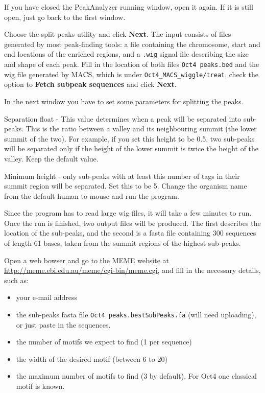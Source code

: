 \begin{steps}
If you have closed the PeakAnalyzer running window, open it again. If it is
still open, just go back to the first window.

Choose the split peaks utility and click \textbf{Next}. The input consists of
files generated by most peak-finding tools: a file containing the chromosome,
start and end locations of the enriched regions, and a \texttt{.wig} signal file
describing the size and shape of each peak. Fill in the location of both files
\texttt{Oct4 peaks.bed} and the wig file generated by MACS, which is under
\texttt{Oct4\_MACS\_wiggle/treat}, check the option to \textbf{Fetch subpeak
sequences} and click \textbf{Next}.

In the next window you have to set some parameters for splitting the peaks.

Separation float - This value determines when a peak will be separated into
sub-peaks. This is the ratio between a valley and its neighbouring summit (the
lower summit of the two). For example, if you set this height to be 0.5, two
sub-peaks will be separated only if the height of the lower summit is twice the
height of the valley. Keep the default value.

Minimum height - only sub-peaks with at least this number of tags in their
summit region will be separated. Set this to be 5. Change the organism name from
the default human to mouse and run the program.
\end{steps}

\begin{information}
Since the program has to read large wig files, it will take a few minutes to
run. Once the run is finished, two output files will be produced. The first
describes the location of the sub-peaks, and the second is a fasta file
containing 300 sequences of length 61 bases, taken from the summit regions of
the highest sub-peaks.
\end{information}

\begin{steps}
Open a web bowser and go to the MEME website at
\url{http://meme.ebi.edu.au/meme/cgi-bin/meme.cgi}, and fill in the necessary
details, such as:
\begin{itemize}
	\item your e-mail address 
	\item the sub-peaks fasta file \texttt{Oct4 peaks.bestSubPeaks.fa} (will need uploading), or just paste in the sequences. 
	\item the number of motifs we expect to find (1 per sequence) 
	\item the width of the desired motif (between 6 to 20) 
	\item the maximum number of motifs to find (3 by default). For Oct4 one classical motif is known. 
\end{itemize}
\end{steps}

